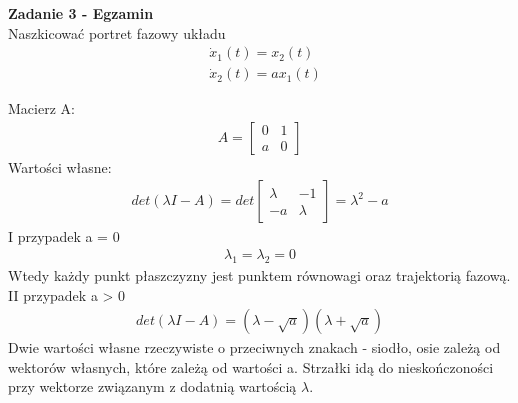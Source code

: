 \documentclass[a4paper,11pt]{article}
\begin{document}
\newpage
\begin{framed}
\textbf{Zadanie 3 - Egzamin } \\ 
Naszkicować portret fazowy układu
\begin{align*}
&\dot{x}_{1}(t)=x_{2}(t) \\
&\dot{x}_{2}(t)=ax_{1}(t)
\end{align*}
\end{framed}
Macierz A:
\begin{align*}
A = 
\begin{bmatrix}
0 & 1 \\
a & 0
\end{bmatrix}
\end{align*}
Wartości własne:
\begin{align*}
det ( \lambda I - A ) = det 
\begin{bmatrix}
\lambda & -1 \\
-a & \lambda
\end{bmatrix}
=
\lambda ^{2} - a
\end{align*}
I przypadek a = 0
\begin{align*}
\lambda _{1} = \lambda _{2} = 0
\end{align*}
Wtedy każdy punkt płaszczyzny jest punktem równowagi oraz trajektorią fazową. 
\\ 
II przypadek a > 0
\begin{align*}
det ( \lambda I - A ) = ( \lambda - \sqrt{a} )( \lambda + \sqrt{a} ) 
\end{align*}
Dwie wartości własne rzeczywiste o przeciwnych znakach - siodło, osie zależą od wektorów własnych, które zależą od wartości a. Strzałki idą do nieskończoności przy wektorze związanym z dodatnią wartością \( \lambda \). 
\end{document}
